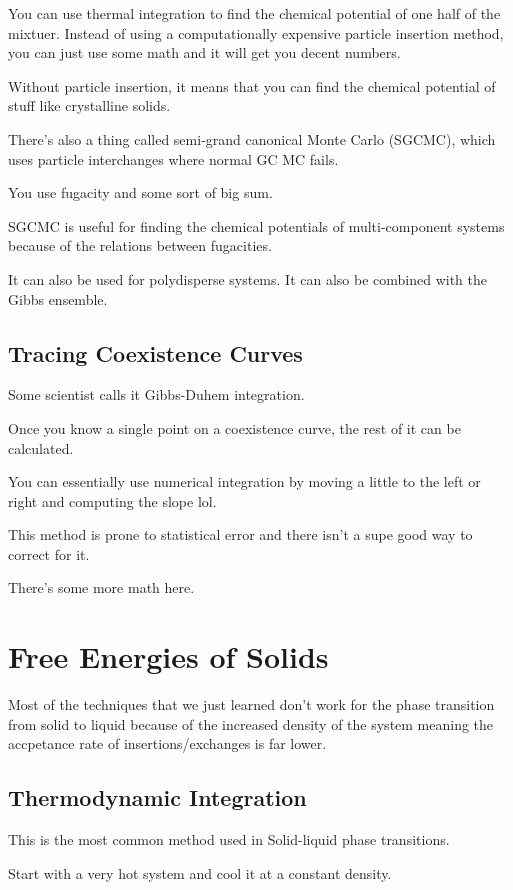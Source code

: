 \documentclass[fleqn]{report}
\begin{document}
You can use thermal integration to find the chemical potential of 
one half of the mixtuer. Instead of using a computationally expensive 
particle insertion method, you can just use some math and it will 
get you decent numbers. 

Without particle insertion, it means that you can find the chemical potential 
of stuff like crystalline solids. 

There's also a thing called semi-grand canonical Monte Carlo (SGCMC), which uses 
particle interchanges where normal GC MC fails.

You use fugacity and some sort of big sum.

SGCMC is useful for finding the chemical potentials of multi-component systems 
because of the relations between fugacities. 

It can also be used for polydisperse systems. It can also be combined 
with the Gibbs ensemble. 

\section{Tracing Coexistence Curves}
Some scientist calls it Gibbs-Duhem integration. 

Once you know a single point on a coexistence curve, the rest of it 
can be calculated. 

You can essentially use numerical integration by moving a little to the 
left or right and computing the slope lol.

This method is prone to statistical error and there isn't a supe good 
way to correct for it. 

There's some more math here. 

\chapter{Free Energies of Solids}
Most of the techniques that we just learned don't work for the phase 
transition from solid to liquid because of the increased density of the system 
meaning the accpetance rate of insertions/exchanges is far lower.

\section{Thermodynamic Integration}
This is the most common method used in Solid-liquid phase transitions. 

Start with a very hot system and cool it at a constant density. 
\end{document}
